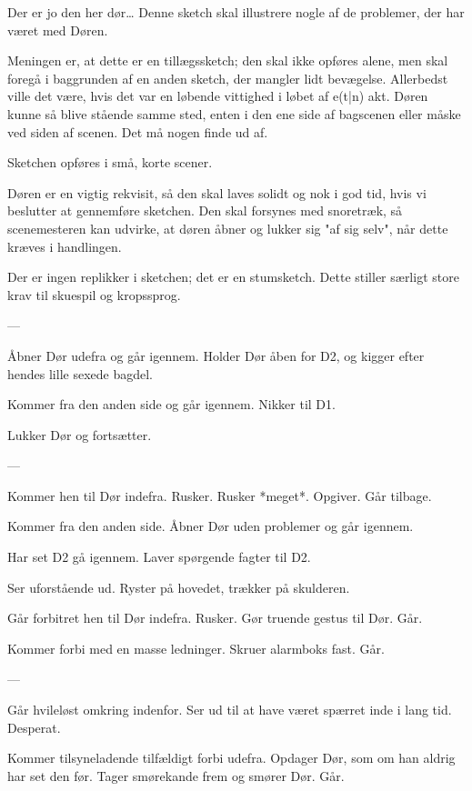 \documentclass[danish]{article}
\begin{document}
\begin{sketch}
  
\scene Der er jo den her dør\ldots{} Denne sketch skal illustrere nogle af de
problemer, der har været med Døren.

Meningen er, at dette er en tillægssketch; den skal ikke opføres alene, men skal
foregå i baggrunden af en anden sketch, der mangler lidt bevægelse. Allerbedst
ville det være, hvis det var en løbende vittighed i løbet af e(t|n) akt. Døren
kunne så blive stående samme sted, enten i den ene side af bagscenen eller måske
ved siden af scenen. Det må nogen finde ud af.

Sketchen opføres i små, korte scener.
                
Døren er en vigtig rekvisit, så den skal laves solidt og nok i god tid, hvis vi
beslutter at gennemføre sketchen. Den skal forsynes med snoretræk, så
scenemesteren kan udvirke, at døren åbner og lukker sig "af sig selv", når dette
kræves i handlingen.

Der er ingen replikker i sketchen; det er en stumsketch.  Dette stiller særligt
store krav til skuespil og kropssprog.

---

Åbner Dør udefra og går igennem. Holder Dør åben for D2, og kigger efter hendes lille sexede bagdel.

Kommer fra den anden side og går igennem. Nikker til D1.

Lukker Dør og fortsætter.

---

Kommer hen til Dør indefra. Rusker. Rusker *meget*. Opgiver. Går tilbage.

Kommer fra den anden side. Åbner Dør uden problemer og går igennem.

Har set D2 gå igennem. Laver spørgende fagter til D2.

Ser uforstående ud. Ryster på hovedet, trækker på skulderen.

Går forbitret hen til Dør indefra. Rusker. Gør truende gestus til Dør. Går.

Kommer forbi med en masse ledninger. Skruer alarmboks fast. Går. 

---

Går hvileløst omkring indenfor. Ser ud til at have været spærret inde i lang
tid. Desperat.

Kommer tilsyneladende tilfældigt forbi udefra. Opdager Dør, som om han aldrig
har set den før. Tager smørekande frem og smører Dør. Går.
        

\end{sketch}
\end{document}
